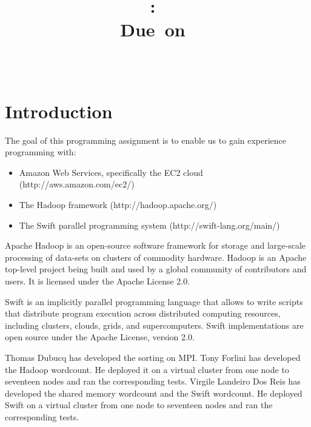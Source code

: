 \documentclass{article}
\title{
\vspace{2in}
\textmd{\textbf{\hmwkClass:\ \hmwkTitle}}\\
\normalsize\vspace{0.1in}\small{Due\ on\ \hmwkDueDate}\\
\vspace{0.1in}\large{\textit{\hmwkClassInstructor\ \hmwkClassTime}}
\vspace{3in}
}
\author{\textbf{\hmwkAuthorName}}
\date{} %
\begin{document}
\maketitle



\newpage
\tableofcontents
\newpage



\section{Introduction}
The goal of this programming assignment is to enable us to gain experience programming with:
\begin{itemize}
  \item Amazon Web Services, specifically the EC2 cloud (http://aws.amazon.com/ec2/)
  \item The Hadoop framework (http://hadoop.apache.org/)
  \item The Swift parallel programming system (http://swift-lang.org/main/)\\
\end{itemize}

Apache Hadoop is an open-source software framework for storage and large-scale processing of data-sets on clusters of commodity hardware. Hadoop is an Apache top-level project being built and used by a global community of contributors and users. It is licensed under the Apache License 2.0.

Swift is an implicitly parallel programming language that allows to write scripts that distribute program execution across distributed computing resources, including clusters, clouds, grids, and supercomputers. Swift implementations are open source under the Apache License, version 2.0.

Thomas Dubucq has developed the sorting on MPI.
Tony Forlini has developed the Hadoop wordcount. He deployed it on a virtual cluster from one node to seventeen nodes and ran the corresponding tests.
Virgile Landeiro Dos Reis has developed the shared memory wordcount and the Swift wordcount. He deployed Swift on a virtual cluster from one node to seventeen nodes and ran the corresponding tests.
\end{document}
